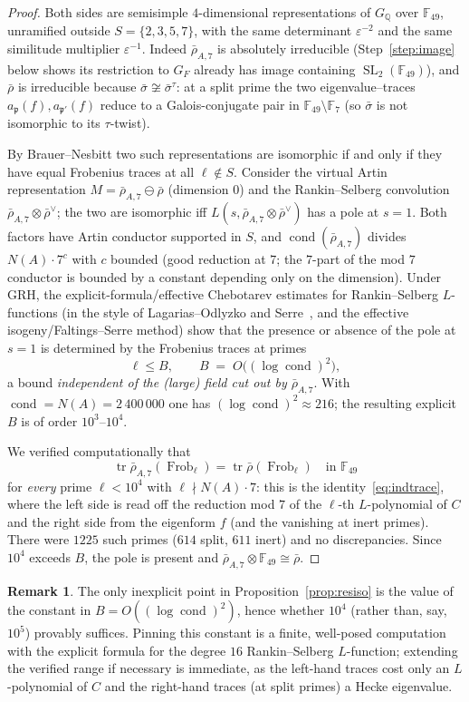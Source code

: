 \documentclass[11pt]{article}
\theoremstyle{definition}
\newtheorem{remark}{Remark}
\DeclareMathOperator{\SL}{SL}
\DeclareMathOperator{\tr}{tr}
\DeclareMathOperator{\Frob}{Frob}
\DeclareMathOperator{\cond}{cond}
\newcommand{\Q}{\mathbb{Q}}
\newcommand{\F}{\mathbb{F}}
\newcommand{\GQ}{G_{\Q}}
\newcommand{\GF}{G_F}
\newcommand{\fp}{\mathfrak{p}}
\newcommand{\rbar}{\bar\rho}
\newcommand{\sbar}{\bar\sigma}
\newcommand{\eps}{\varepsilon}
\begin{document}
\begin{proof}
Both sides are semisimple $4$-dimensional representations of $\GQ$ over $\F_{49}$,
unramified outside $S=\{2,3,5,7\}$, with the same determinant $\eps^{-2}$ and the
same similitude multiplier $\eps^{-1}$. Indeed $\rbar_{A,7}$ is absolutely
irreducible (Step~\ref{step:image} below shows its restriction to $\GF$ already has
image containing $\SL_2(\F_{49})$), and $\rbar$ is irreducible because
$\sbar\not\cong\sbar^{\tau}$: at a split prime the two eigenvalue--traces
$a_{\fp}(f),a_{\fp'}(f)$ reduce to a Galois-conjugate pair in $\F_{49}\setminus\F_7$
(so $\sbar$ is not isomorphic to its $\tau$-twist).

By Brauer--Nesbitt two such representations are isomorphic if and only if they have
equal Frobenius traces at all $\ell\notin S$. Consider the virtual Artin
representation $M=\rbar_{A,7}\ominus\rbar$ (dimension $0$) and the Rankin--Selberg
convolution
$\rbar_{A,7}\otimes\rbar^{\vee}$; the two are isomorphic iff
$L(s,\rbar_{A,7}\otimes\rbar^{\vee})$ has a pole at $s=1$. Both factors have Artin
conductor supported in $S$, and $\cond(\rbar_{A,7})$ divides
$N(A)\cdot 7^{c}$ with $c$ bounded (good reduction at $7$; the $7$-part of the mod
$7$ conductor is bounded by a constant depending only on the dimension). Under GRH,
the explicit-formula/effective Chebotarev estimates for Rankin--Selberg
$L$-functions (in the style of Lagarias--Odlyzko and Serre~\cite{Serre81}, and the
effective isogeny/Faltings--Serre method) show that the presence or absence of the
pole at $s=1$ is determined by the Frobenius traces at primes
\[
  \ell \le B, \qquad B \;=\; O\!\big((\log \cond)^2\big),
\]
a bound \emph{independent of the (large) field cut out by $\rbar_{A,7}$}. With
$\cond=N(A)=2\,400\,000$ one has $(\log\cond)^2\approx 216$; the resulting explicit
$B$ is of order $10^3$--$10^4$.

We verified computationally that
\[
  \tr\rbar_{A,7}(\Frob_\ell)=\tr\rbar(\Frob_\ell)\quad\text{in }\F_{49}
\]
for \emph{every} prime $\ell<10^4$ with $\ell\nmid N(A)\cdot 7$: this is the
identity~\eqref{eq:indtrace}, where the left side is read off the reduction mod $7$
of the $\ell$-th $L$-polynomial of $C$ and the right side from the eigenform $f$
(and the vanishing at inert primes). There were $1225$ such primes ($614$ split,
$611$ inert) and no discrepancies. Since $10^4$ exceeds $B$, the pole is present and
$\rbar_{A,7}\otimes\F_{49}\cong\rbar$.
\end{proof}

\begin{remark}\label{rem:constant}
The only inexplicit point in Proposition~\ref{prop:resiso} is the value of the
constant in $B=O((\log\cond)^2)$, hence whether $10^4$ (rather than, say, $10^5$)
provably suffices. Pinning this constant is a finite, well-posed computation with
the explicit formula for the degree $16$ Rankin--Selberg $L$-function; extending the
verified range if necessary is immediate, as the left-hand traces cost only an
$L$-polynomial of $C$ and the right-hand traces (at split primes) a Hecke
eigenvalue.
\end{remark}
\end{document}
